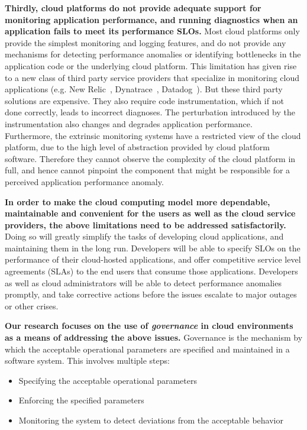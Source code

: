 \textbf{Thirdly, cloud platforms do not provide adequate support for monitoring application performance,
and running diagnostics when an application fails to meet its performance SLOs.} 
Most cloud platforms only provide the simplest monitoring and logging features,
and do not provide any mechanisms for detecting performance anomalies or identifying
bottlenecks in the application code or the underlying cloud platform. This limitation has given rise
to a new class of third party service providers that specialize in monitoring cloud applications
(e.g. New Relic~\cite{newrelic}, Dynatrace~\cite{dynatrace}, Datadog~\cite{datadog}). But these 
third party solutions are expensive. They also require code instrumentation, which
if not done correctly, leads to incorrect diagnoses. The perturbation
introduced by the instrumentation also changes and degrades application performance.
Furthermore, the extrinsic monitoring systems have a restricted view 
of the cloud platform, due to the high level of abstraction provided by cloud platform software.
Therefore they cannot observe the complexity of the cloud platform in full, and hence cannot pinpoint
the component that might be responsible for a perceived application performance anomaly.

\textbf{In order to make the cloud computing model more dependable, maintainable and convenient for the users as well
as the cloud service providers, the above limitations need to be addressed satisfactorily.}
Doing so will greatly simplify the tasks of developing cloud applications, and maintaining 
them in the long run. Developers will be able to specify SLOs on the performance of
their cloud-hosted applications, and offer competitive service level agreements (SLAs) to the end users that consume those
applications. Developers as well as cloud administrators will be able to detect performance anomalies
promptly, and take corrective actions before the issues escalate to major
outages or other crises.

\textbf{Our research focuses on the use of \textit{governance} in cloud environments 
as a means of addressing the above issues.} Governance is the mechanism 
by which the acceptable operational parameters are specified and maintained in a 
software system. This involves multiple steps:
\begin{itemize}
\item Specifying the acceptable operational parameters
\item Enforcing the specified parameters
\item Monitoring the system to detect deviations from the acceptable behavior
\end{itemize}

